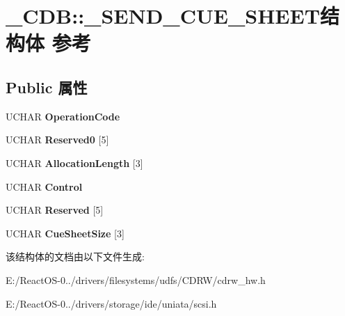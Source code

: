 \hypertarget{struct___c_d_b_1_1___s_e_n_d___c_u_e___s_h_e_e_t}{}\section{\+\_\+\+C\+DB\+:\+:\+\_\+\+S\+E\+N\+D\+\_\+\+C\+U\+E\+\_\+\+S\+H\+E\+E\+T结构体 参考}
\label{struct___c_d_b_1_1___s_e_n_d___c_u_e___s_h_e_e_t}
\subsection*{Public 属性}
\begin{DoxyCompactItemize}
\item 
\mbox{\label{struct___c_d_b_1_1___s_e_n_d___c_u_e___s_h_e_e_t_a47a419d2c312ca524535a29d2e96cf84}} 
U\+C\+H\+AR {\bfseries Operation\+Code}
\item 
\mbox{\label{struct___c_d_b_1_1___s_e_n_d___c_u_e___s_h_e_e_t_a05d3dcda263a8b98c1edce0463b35020}} 
U\+C\+H\+AR {\bfseries Reserved0} \mbox{[}5\mbox{]}
\item 
\mbox{\label{struct___c_d_b_1_1___s_e_n_d___c_u_e___s_h_e_e_t_a87536822185cbb8708de3c24cfbbfeaa}} 
U\+C\+H\+AR {\bfseries Allocation\+Length} \mbox{[}3\mbox{]}
\item 
\mbox{\label{struct___c_d_b_1_1___s_e_n_d___c_u_e___s_h_e_e_t_ab0965e661f43d4d227dd3b532e048220}} 
U\+C\+H\+AR {\bfseries Control}
\item 
\mbox{\label{struct___c_d_b_1_1___s_e_n_d___c_u_e___s_h_e_e_t_afc7e7ae2dfbdf79562906c887f827576}} 
U\+C\+H\+AR {\bfseries Reserved} \mbox{[}5\mbox{]}
\item 
\mbox{\label{struct___c_d_b_1_1___s_e_n_d___c_u_e___s_h_e_e_t_a75fe6dae049f90323f0d8872cce1fee1}} 
U\+C\+H\+AR {\bfseries Cue\+Sheet\+Size} \mbox{[}3\mbox{]}
\end{DoxyCompactItemize}


该结构体的文档由以下文件生成\+:\begin{DoxyCompactItemize}
\item 
E\+:/\+React\+O\+S-\/0../drivers/filesystems/udfs/\+C\+D\+R\+W/cdrw\+\_\+hw.\+h\item 
E\+:/\+React\+O\+S-\/0../drivers/storage/ide/uniata/scsi.\+h\end{DoxyCompactItemize}
